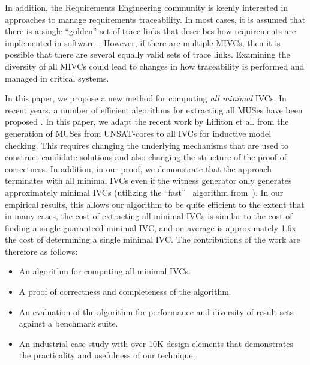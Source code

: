\noindent In addition, the Requirements Engineering community is keenly interested in approaches to manage requirements traceability.  In most cases, it is assumed that there is a single ``golden'' set of trace links that describes how requirements are implemented in software~\cite{COEST,hayes2003improving,cleland2007best}.  However, if there are multiple MIVCs, then it is possible that there are several equally valid sets of trace links.  Examining the diversity of all MIVCs could lead to changes in how traceability is performed and managed in critical systems.


In this paper, we propose a new method for computing \emph{all minimal} IVCs. In  recent  years,  a  number  of  efficient
algorithms  for  extracting  all MUSes  have  been proposed \cite{bacchus2015using, belov2012muser2, belov2013core, belov2012towards, nadel2014accelerated, liffiton2005max}.  In this paper, we adapt the recent work by Liffiton et al. \cite{marco2016fast} from the generation of MUSes from UNSAT-cores to all IVCs for inductive model checking.  This requires changing the underlying mechanisms that are used to construct candidate solutions and also changing the structure of the proof of correctness.  In addition, in our proof, we demonstrate that the approach terminates with all minimal IVCs even if the witness generator only generates approximately minimal IVCs (utilizing the ``fast'' \ucalg\ algorithm from~\cite{Ghass16}).  In our empirical results, this allows our algorithm to be quite efficient to the extent that in many cases, the cost of extracting all minimal IVCs is similar to the cost of finding a single guaranteed-minimal IVC, and on average is approximately 1.6x the cost of determining a single minimal IVC.
The contributions of the work are therefore as follows:
\begin{itemize}
    \item An algorithm for computing all minimal IVCs.
    \item A proof of correctness and completeness of the algorithm.
    \item An evaluation of the algorithm for performance and diversity of result sets against a benchmark suite.
    \item An industrial case study with over 10K design elements that demonstrates the practicality and usefulness of our technique.
\end{itemize}

